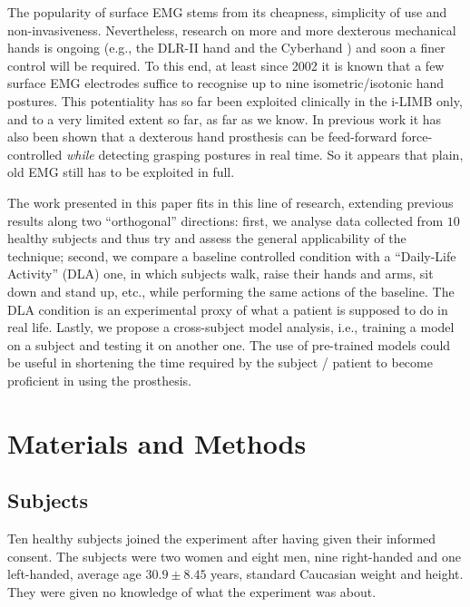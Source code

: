 \documentclass[10pt]{bmc_article}
\newenvironment{bmcformat}
  {\begin{raggedright}\baselineskip20pt\sloppy\setboolean{publ}{false}}
  {\end{raggedright}\baselineskip20pt\sloppy}
\begin{document}
\begin{bmcformat}
The popularity of surface EMG stems from its cheapness, simplicity of use
and non-invasiveness. Nevertheless, research on more and more dexterous
mechanical hands is ongoing (e.g., the DLR-II hand \cite{Hua2006} and the
Cyberhand \cite{cyberhand,cipriani}) and soon a finer control will be
required. To this end, at least since 2002
\cite{dunlop,zecca,smagt,2008.ICRA} it is known that a few surface EMG
electrodes suffice to recognise up to nine isometric/isotonic hand postures.
This potentiality has so far been exploited clinically in the i-LIMB only,
and to a very limited extent so far, as far as we know. In previous work
it has also been shown that a dexterous hand prosthesis can be
feed-forward force-controlled \emph{while} detecting
grasping postures \cite{2008.ICRA,2008.BioCyb} in real time.
So it appears that plain, old EMG still has to be exploited in full.

The work presented in this paper fits in this line of research,
extending previous results along two ``orthogonal'' directions: first, we analyse
data collected from $10$ healthy subjects and thus try and assess the general
applicability of the technique; second, we compare a baseline controlled
condition with a ``Daily-Life Activity'' (DLA) one, in which subjects walk, raise
their hands and arms, sit down and stand up, etc., while performing the same
actions of the baseline. The DLA condition is an experimental proxy
of what a patient is supposed to do in real life. Lastly, we propose a
cross-subject model analysis, i.e., training a
model on a subject and testing it on another one. The use
of pre-trained models could be useful in shortening the time required by
the subject / patient to become proficient in using the prosthesis.

\section*{Materials and Methods}
\label{sec:m&ms}

\subsection*{Subjects}

Ten healthy subjects joined the experiment after having given their informed
consent. The subjects were two women and eight men, nine right-handed and one
left-handed, average age $30.9 \pm 8.45$ years, standard Caucasian weight and
height. They were given no knowledge of what the experiment was about.


\end{bmcformat}
\end{document}
